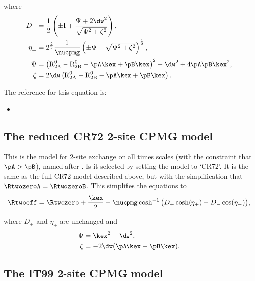 where
\begin{align}
    D_\pm    &= \frac{1}{2} \left( \pm1 + \frac{\Psi + 2\dw^2}{\sqrt{\Psi^2 + \zeta^2}} \right) , \\
    \eta_\pm &= 2^{\frac{2}{3}}\frac{1}{\nucpmg} \left( \pm\Psi + \sqrt{\Psi^2 + \zeta^2} \right)^{\frac{1}{2}} , \\
    \Psi     &= \left( \textrm{R}_\textrm{2A}^0 - \textrm{R}_\textrm{2B}^0 - \pA\kex + \pB\kex \right)^2 - \dw^2 + 4\pA\pB\kex^2 , \\
    \zeta    &= 2\dw \left( \textrm{R}_\textrm{2A}^0 - \textrm{R}_\textrm{2B}^0 - \pA\kex + \pB\kex \right).
\end{align}

The reference for this equation is:
\begin{itemize}
\item {}
\end{itemize}




\subsection{The reduced CR72 2-site CPMG model}
\label{sect: dispersion: CR72 model}

This is the model for 2-site exchange on all times scales (with the constraint that $\pA > \pB$), named after \citet{CarverRichards72}.
Is it selected by setting the model to `CR72'.
It is the same as the full CR72 model described above, but with the simplification that $\RtwozeroA = \RtwozeroB$.
This simplifies the equations to
\begin{equation}
    \Rtwoeff = \Rtwozero + \frac{\kex}{2} - \nucpmg\cosh^{-1} \big( D_+\cosh(\eta_+) - D_-\cos(\eta_-) \big) ,
\end{equation}

where $D_\pm$ and $\eta_\pm$ are unchanged and
\begin{align}
    \Psi  &= \kex^2 - \dw^2 , \\
    \zeta &= -2\dw (\pA\kex - \pB\kex) .
\end{align}




\subsection{The IT99 2-site CPMG model}
\label{sect: dispersion: IT99 model}

